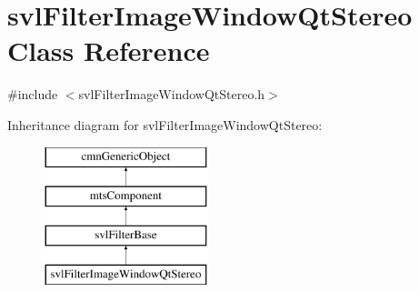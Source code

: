 \hypertarget{classsvl_filter_image_window_qt_stereo}{}\section{svl\+Filter\+Image\+Window\+Qt\+Stereo Class Reference}
\label{classsvl_filter_image_window_qt_stereo}


{\ttfamily \#include $<$svl\+Filter\+Image\+Window\+Qt\+Stereo.\+h$>$}

Inheritance diagram for svl\+Filter\+Image\+Window\+Qt\+Stereo\+:\begin{figure}[H]
\begin{center}
\leavevmode
\includegraphics[height=4.000000cm]{df/dd3/classsvl_filter_image_window_qt_stereo}
\end{center}
\end{figure}
